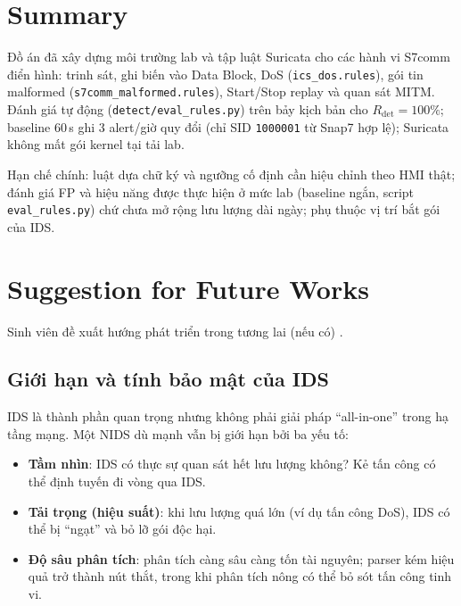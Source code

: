\documentclass[../main.tex]{subfiles}
\begin{document}
\section{Summary}

Đồ án đã xây dựng môi trường lab và tập luật Suricata cho các hành vi S7comm điển hình: trinh sát, ghi biến vào Data Block, DoS (\texttt{ics\_dos.rules}), gói tin malformed (\texttt{s7comm\_malformed.rules}), Start/Stop replay và quan sát MITM. Đánh giá tự động (\texttt{detect/eval\_rules.py}) trên bảy kịch bản cho $R_{\mathrm{det}} = 100\%$; baseline 60\,s ghi 3 alert/giờ quy đổi (chỉ SID \texttt{1000001} từ Snap7 hợp lệ); Suricata không mất gói kernel tại tải lab.

Hạn chế chính: luật dựa chữ ký và ngưỡng cố định cần hiệu chỉnh theo HMI thật; đánh giá FP và hiệu năng được thực hiện ở mức lab (baseline ngắn, script \texttt{eval\_rules.py}) chứ chưa mở rộng lưu lượng dài ngày; phụ thuộc vị trí bắt gói của IDS.  

\section{Suggestion for Future Works }

Sinh viên đề xuất hướng phát triển trong tương lai (nếu có) .

\subsection{Giới hạn và tính bảo mật của IDS}

IDS là thành phần quan trọng nhưng không phải giải pháp ``all-in-one'' trong hạ tầng mạng. Một NIDS dù mạnh vẫn bị giới hạn bởi ba yếu tố:

\begin{itemize}
    \item \textbf{Tầm nhìn}: IDS có thực sự quan sát hết lưu lượng không? Kẻ tấn công có thể định tuyến đi vòng qua IDS.
    \item \textbf{Tải trọng (hiệu suất)}: khi lưu lượng quá lớn (ví dụ tấn công DoS), IDS có thể bị ``ngạt'' và bỏ lỡ gói độc hại.
    \item \textbf{Độ sâu phân tích}: phân tích càng sâu càng tốn tài nguyên; parser kém hiệu quả trở thành nút thắt, trong khi phân tích nông có thể bỏ sót tấn công tinh vi.
\end{itemize}
\end{document}
